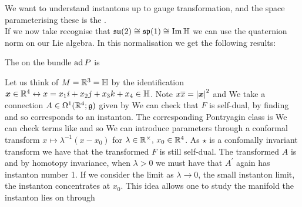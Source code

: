 \documentclass{article}
\begin{document}
We want to understand instantons up to gauge transformation, and the space parameterising these is the . \\
If we now take recognise that $\mathfrak{su}(2) \cong \mathfrak{sp}(1) \cong \operatorname{Im} \mathbb{H}$ we can use the quaternion norm on our Lie algebra. In this normalisation we get the following results:
\begin{lemma}
	The  on the bundle $\operatorname{ad} P$ is 
\end{lemma}

\begin{example}
	Let us think of $M=\mathbb{R}^3 = \mathbb{H}$ by the identification $\bm{x} \in \mathbb{R}^4 \leftrightarrow x = x_1 i + x_2 j + x_3 k + x_4 \in \mathbb{H}$. Note $x\overline{x} = \left\lvert \bm{x} \right\rvert^2$ and 
We take a connection $A \in \Omega^1(\mathbb{R}^4; \mathfrak{g})$ given by 
We can check that $F$ is self-dual, by finding 
and so corresponds to an instanton. The corresponding Pontryagin class is 
We can check terms like 
and so 
We can introduce parameters through a conformal transform $x \mapsto \lambda^{-1}(x-x_0)$ for $\lambda \in \mathbb{R}^\times, \, x_0 \in \mathbb{R}^4$. As $\star$ is a confomally invariant transform we have that the transformed $F$ is still self-dual. The transformed $A$ is 
and by homotopy invariance, when $\lambda>0$ we must have that $A^\prime$ again has instanton number 1. If we consider the limit as $\lambda \to 0$, the small instanton limit, the instanton concentrates at $x_0$. This idea allows one to study the manifold the instanton lies on through 
\end{example}
\end{document}
